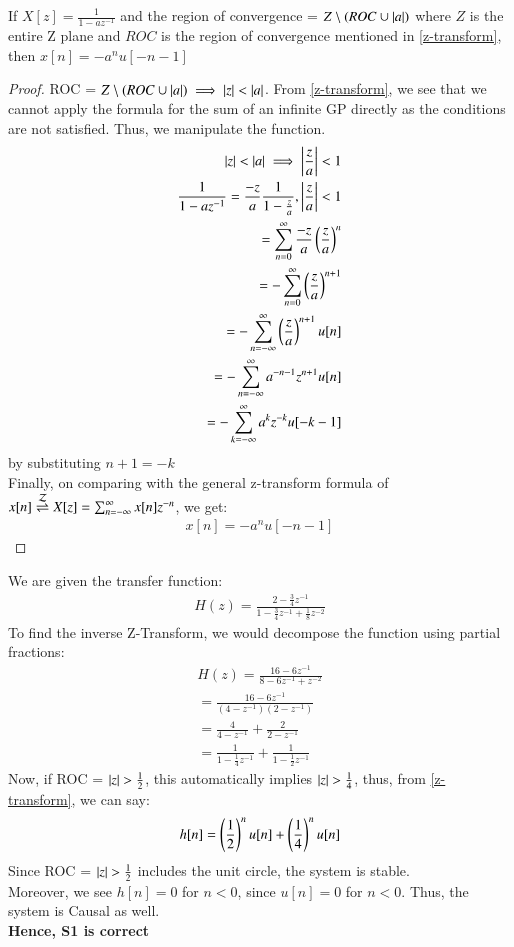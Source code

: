 \documentclass[journal,12pt,twocolumn]{IEEEtran}
\begin{document}
\begin{lemma}
If $X[z] = \frac{1}{1 - az^{-1}}$ and the region of convergence = $Z \setminus (ROC \cup \left\vert a\right\vert)$ where $Z$ is the entire Z plane and $ROC$ is the region of convergence mentioned in \eqref{z-transform}, then $x[n] = -a^nu[-n-1]$
\label{ROC-violation}
\end{lemma}
\begin{proof}
ROC =  $Z \setminus (ROC \cup \left\vert a\right\vert) \implies \left\vert z\right\vert  < \left\vert a\right\vert$. From \eqref{z-transform}, we see that we cannot apply the formula for the sum of an infinite GP directly as the conditions are not satisfied. Thus, we manipulate the function.
\begin{align}
    \left\vert z\right\vert  < \left\vert a\right\vert \implies \left\vert\frac{z}{a}\right\vert < 1\\
    \frac{1}{1 - az^{-1}} = \frac{-z}{a}\frac{1}{1 - \frac{z}{a}} , \left\vert\frac{z}{a}\right\vert < 1\\
     = \sum_{n = 0}^\infty \frac{-z}{a} \left(\frac{z}{a}\right)^n\\
      = - \sum_{n = 0}^\infty  \left(\frac{z}{a}\right)^{n+1}\\
       = - \sum_{n = -\infty}^\infty  \left(\frac{z}{a}\right)^{n+1}u[n]\\
     = -\sum_{n = -\infty}^\infty  a^{-n-1}z^{n+1}u[n]\\
      = -\sum_{k = -\infty}^\infty  a^{k}z^{-k}u[-k-1]
\end{align}
by substituting $n+1 = -k$\\
Finally, on comparing with the general z-transform formula of $x[n] \overset{\mathcal{Z}}{ \rightleftharpoons} X[z] = \sum_{n = -\infty}^\infty x[n]z^{-n}$, we get:
\begin{align}
    x[n] = -a^nu[-n-1]
\end{align}
\end{proof}
We are given the transfer function:
\begin{align}
    H(z) = \frac{2 - \frac{3}{4}z^{-1}}{1 - \frac{3}{4}z^{-1} + \frac{1}{8}z^{-2}}
\end{align}
To find the inverse Z-Transform, we would decompose the function using partial fractions:
\begin{align}
    H(z) = \frac{16 - 6z^{-1}}{8 - 6z^{-1} + z^{-2}}\\
     = \frac{16 - 6z^{-1}}{(4 - z^{-1})(2 - {z^{-1}})}\\
      = \frac{4}{4 - z^{-1}} +\frac{2}{2 - z^{-1}}\\
       = \frac{1}{1 - \frac{1}{4}z^{-1}} + \frac{1}{1 - \frac{1}{2}z^{-1}}
       \label{partial-fraction}
\end{align}
Now, if ROC = $\left\vert z\right\vert>\frac{1}{2}$, this automatically implies $\left\vert z\right\vert > \frac{1}{4}$, thus, from \eqref{z-transform}, we can say:
\begin{align}
    h[n] = \left(\frac{1}{2}\right)^n u[n] + \left(\frac{1}{4}\right)^n u[n] 
\end{align}
Since ROC = $\left\vert z\right\vert>\frac{1}{2}$ includes the unit circle, the system is stable.\\
Moreover, we see $h[n] = 0 $
 for $n < 0$, since $u[n] = 0$ for $n< 0$. Thus, the system is Causal as well.\\\textbf{ Hence, S1 is correct}\\
 
\end{document}
